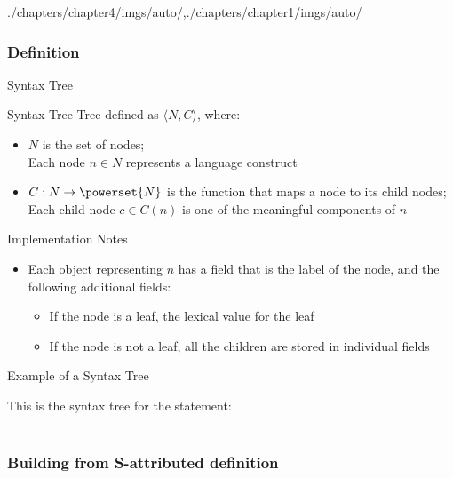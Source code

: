 \begin{graphicspathcontext}{{./chapters/chapter4/imgs/auto/},{./chapters/chapter1/imgs/auto/}}
\begin{bibunit}[apalike]
\subsubsection{Definition}
\subsubsectiontableofcontentslide

\begin{frame}{Syntax Tree}
	\begin{definitionblock}{Syntax Tree}
		Tree defined as $\langle N, C \rangle$, where:
		\begin{itemize}
			\item $N$ is the set of nodes; \\
				Each node $n \in N$ represents a language construct
			\item $C : N \rightarrow \powerset{N}$ is the function that maps a node to its child nodes; \\
				Each child node $c \in C(n)$ is one of the meaningful components of $n$
		\end{itemize}
	\end{definitionblock}
	\vspace{.5cm}
	\begin{block}{Implementation Notes}
		\begin{itemize}
		\item Each object representing $n$ has a field that is the label of the node, and the following additional fields:
			\begin{itemize}
			\item If the node is a leaf, the lexical value for the leaf
			\item If the node is not a leaf, all the children are stored in individual fields
			\end{itemize}
		\end{itemize}
	\end{block}
\end{frame}

\begin{frame}{Example of a Syntax Tree}
	\begin{center}
		This is the syntax tree for the statement: \\
			 \\[2em]
	\end{center}
\end{frame}

\subsubsection{Building from S-attributed definition}
\subsubsectiontableofcontentslide


\end{bibunit}
\end{graphicspathcontext}
